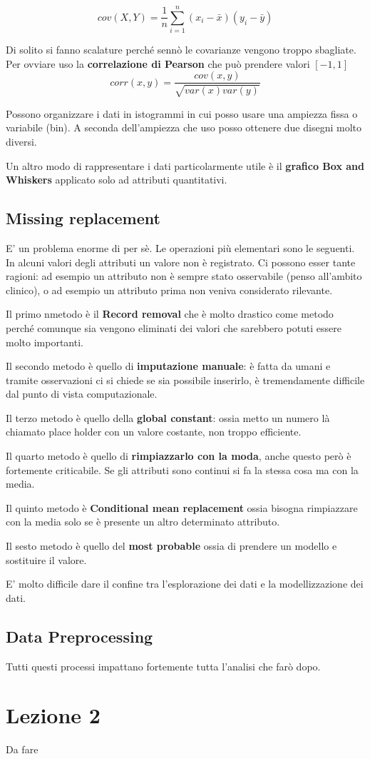 \[cov(X,Y) = \frac{1}{n}\sum_{i = 1}^{n} (x_{i} - \bar{x})(y_{i} - \bar{y})\]

Di solito si fanno scalature perché sennò le covarianze vengono troppo sbagliate. Per ovviare uso la \textbf{correlazione di Pearson} che può prendere valori $[-1,1]$
\[ corr(x,y) = \frac{cov(x,y)}{\sqrt{var(x)var(y)}}\]

Possono organizzare i dati in istogrammi in cui posso usare una ampiezza fissa o variabile (bin). A seconda dell'ampiezza che uso posso ottenere due disegni molto diversi.

Un altro modo di rappresentare i dati particolarmente utile è il \textbf{grafico Box and Whiskers} applicato solo ad attributi quantitativi.

\subsection{Missing replacement}

E' un problema enorme di per sè. Le operazioni più elementari sono le seguenti. In alcuni valori degli attributi un valore non è registrato. Ci possono esser tante ragioni: ad esempio un attributo non è sempre stato osservabile (penso all'ambito clinico), o ad esempio un attributo prima non veniva considerato rilevante.

Il primo nmetodo è il \textbf{Record removal} che è molto drastico come metodo perché comunque sia vengono eliminati dei valori che sarebbero potuti essere molto importanti.

Il secondo metodo è quello di \textbf{imputazione manuale}: è fatta da umani e tramite osservazioni ci si chiede se sia possibile inserirlo, è tremendamente difficile dal punto di vista computazionale.

Il terzo metodo è quello della \textbf{global constant}: ossia metto un numero là chiamato place holder con un valore costante, non troppo efficiente.

Il quarto metodo è quello di \textbf{rimpiazzarlo con la moda}, anche questo però è fortemente criticabile.
Se gli attributi sono continui si fa la stessa cosa ma con la media.

Il quinto metodo è \textbf{Conditional mean replacement} ossia bisogna rimpiazzare con la media solo se è presente un altro determinato attributo.

Il sesto metodo è quello del \textbf{most probable} ossia di prendere un modello e sostituire il valore.

E' molto difficile dare il confine tra l'esplorazione dei dati e la modellizzazione dei dati.

\subsection{Data Preprocessing}

Tutti questi processi impattano fortemente tutta l'analisi che farò dopo.
\section{Lezione 2}
Da fare